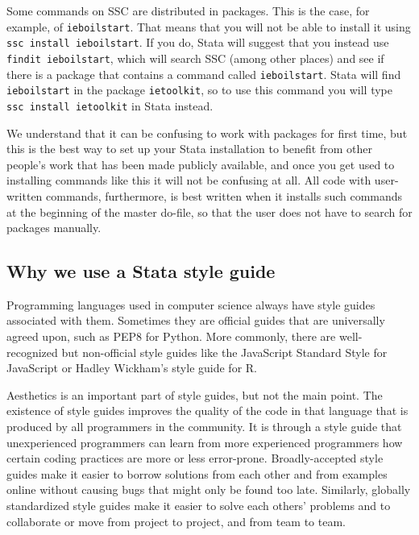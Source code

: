 Some commands on SSC are distributed in packages.
This is the case, for example, of \texttt{ieboilstart}.
That means that you will not be able to install it using \texttt{ssc install ieboilstart}.
If you do, Stata will suggest that you instead use \texttt{findit ieboilstart},
which will search SSC (among other places) and see if there is a
package that contains a command called \texttt{ieboilstart}.
Stata will find \texttt{ieboilstart} in the package \texttt{ietoolkit},
so to use this command you will type \texttt{ssc install ietoolkit} in Stata instead.

We understand that it can be confusing to work with packages for first time,
but this is the best way to set up your Stata installation to benefit from other
people's work that has been made publicly available,
and once you get used to installing commands like this it will not be confusing at all.
All code with user-written commands, furthermore, is best written when it installs such commands
at the beginning of the master do-file, so that the user does not have to search for packages manually.

\subsection{Why we use a Stata style guide}

Programming languages used in computer science always have style guides associated with them.
Sometimes they are official guides that are universally agreed upon, such as PEP8 for
Python. More commonly, there are well-recognized but
non-official style guides like the JavaScript Standard Style for
JavaScript or Hadley Wickham's style guide for R.

Aesthetics is an important part of style guides, but not the main point.
The existence of style guides improves the quality of the code in that language that is produced by all programmers in the community.
It is through a style guide that unexperienced programmers can learn from more experienced programmers
how certain coding practices are more or less error-prone.
Broadly-accepted style guides make it easier to borrow solutions from each other and from examples online without causing bugs that might only be found too late.
Similarly, globally standardized style guides make it easier to solve each others'
problems and to collaborate or move from project to project, and from team to team.

